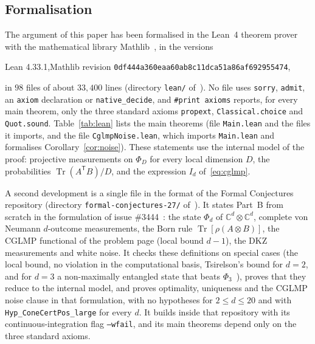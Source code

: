 \documentclass[11pt]{amsart}
\theoremstyle{definition}
\theoremstyle{remark}
\numberwithin{equation}{section}
\newcommand{\C}{\mathbb{C}}
\newcommand{\Tr}{\operatorname{Tr}}
\begin{document}
\subsection{Formalisation}\label{subsec:formal}
The argument of this paper has been formalised in the Lean~4 theorem prover~\cite{Lean} with the mathematical library
Mathlib~\cite{Mathlib}, in the versions
\begin{center}
\small Lean 4.33.1,\qquad Mathlib revision \texttt{0df444a360eaa60ab8c11dca51a86af692955474},
\end{center}
in $98$ files of about $33{,}400$ lines (directory \texttt{lean/} of~\cite{repo-oqp27}). No file uses \texttt{sorry},
\texttt{admit}, an \texttt{axiom} declaration or \texttt{native\_decide}, and \texttt{\#print axioms} reports, for every
main theorem, only the three standard axioms \texttt{propext}, \texttt{Classical.choice} and \texttt{Quot.sound}.
Table~\ref{tab:lean} lists the main theorems (file \texttt{Main.lean} and the files it imports, and the file
\texttt{CglmpNoise.lean}, which imports \texttt{Main.lean} and formalises Corollary~\ref{cor:noise}). These statements
use the internal model of the proof: projective measurements on $\Phi_D$ for every local dimension $D$, the
probabilities $\Tr(A^{\mathsf T}B)/D$, and the expression $I_d$ of~\eqref{eq:cglmp}.

A second development is a single file in the format of the Formal Conjectures repository (directory
\texttt{formal-conjectures-27/} of~\cite{repo-oqp27}). It states Part~B from scratch in the formulation of issue
\#3444~\cite{FC3444}: the state $\Phi_d$ of $\C^d\otimes\C^d$, complete von Neumann $d$-outcome measurements, the Born
rule $\Tr[\rho(A\otimes B)]$, the CGLMP functional of the problem page (local bound $d-1$), the DKZ measurements and white
noise. It checks these definitions on special cases (the local bound, no violation in the computational basis,
Tsirelson's bound for $d=2$, and for $d=3$ a non-maximally entangled state that beats $\Phi_3$~\cite{ADGL}), proves that
they reduce to the internal model, and proves optimality, uniqueness and the CGLMP noise clause in that formulation,
with no hypotheses for $2\le d\le20$ and with \nolinkurl{Hyp_ConeCertPos_large} for every $d$. It builds inside that
repository with its continuous-integration flag \texttt{--wfail}, and its main theorems depend only on the three
standard axioms.
\end{document}
